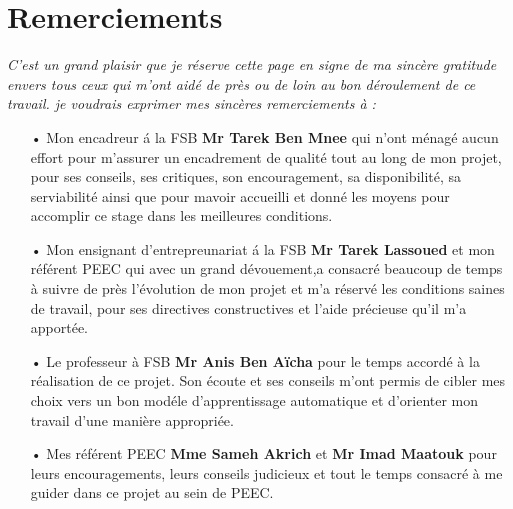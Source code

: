 \documentclass[12pt]{report}
\begin{document}
\newpage

\chapter*{\huge Remerciements}

\begin{center}
\it \textsl
    C’est un grand plaisir que je réserve cette page en signe de ma sincère gratitude
envers tous ceux qui m’ont aidé de près ou de loin au bon déroulement de ce travail.
je voudrais exprimer mes sincères remerciements à :
\vspace*{1cm}
\begin{itemize}
\item[•] Mon encadreur á la FSB \textbf{ Mr Tarek Ben Mnee } qui n’ont ménagé aucun effort pour m'assurer un encadrement de qualité tout au long de mon projet, pour ses
conseils, ses critiques, son encouragement, sa disponibilité, sa serviabilité ainsi que pour mavoir accueilli et donné les moyens pour accomplir ce stage dans les meilleures conditions.
\end{itemize}

\vspace*{1cm}
\begin{itemize}
\item[•] Mon ensignant d'entrepreunariat á la FSB \textbf{ Mr Tarek Lassoued } et mon référent PEEC qui avec un grand dévouement,a consacré beaucoup de temps à suivre de près l’évolution de mon projet et m’a réservé les conditions saines de travail, pour ses directives constructives et l’aide précieuse qu’il m’a apportée.
\end{itemize}


\vspace*{1cm}
\begin{itemize}
\item[•] Le professeur à FSB \textbf{ Mr Anis Ben Aïcha } pour le temps accordé à la
réalisation de ce projet. Son écoute et ses conseils m'ont permis de
cibler mes choix vers un bon modéle d'apprentissage automatique et d’orienter mon travail d’une manière
appropriée.
\end{itemize}

\vspace*{1cm}
\begin{itemize}
\item[•] Mes référent PEEC \textbf{Mme Sameh Akrich} et \textbf{Mr Imad Maatouk} pour leurs encouragements, leurs conseils judicieux et tout le temps consacré à me guider dans ce projet au sein de PEEC.
\end{itemize}


\end{center}
\end{document}
